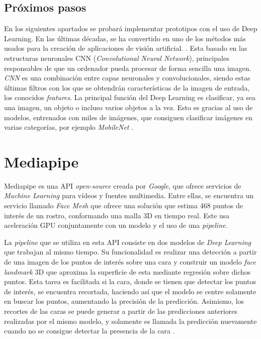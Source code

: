 \vspace{-0.8cm}
\subsection*{Próximos pasos}
\vspace{-0.5cm}
En los siguientes apartados se probará implementar prototipos con el uso de Deep Learning. En las últimas décadas, se ha convertido en uno de los métodos más usados para la creación de aplicaciones de visión artificial. \cite{szeliski_2018}. Esta basado en las estructuras neuronales CNN (\textit{Convolutional Neural Network}), principales responsables de que un ordenador pueda procesar de forma sencilla una imagen. \textit{CNN} es una combinación entre capas neuronales y convolucionales, siendo estas últimas filtros con los que se obtendrán características de la imagen de entrada, los conocidos \textit{features}. La principal función del Deep Learning es clasificar, ya sea una imagen, un objeto o incluso varios objetos a la vez. Esto es gracias al uso de modelos, entrenados con miles de imágenes, que consiguen clasificar imágenes en varias categorías, por ejemplo \textit{MobileNet} \cite{cnn}. 

\newpage
\section{Mediapipe}
\vspace{-0.7cm}

Mediapipe es una API \textit{open-source} creada por \textit{Google}, que ofrece servicios de \textit{Machine Learning} para vídeos y fuentes multimedia. Entre ellas, se encuentra un servicio llamado \textit{Face Mesh} que ofrece una solución que estima 468 puntos de interés de un rostro, conformando una malla 3D en tiempo real. Este usa aceleración GPU conjuntamente con un modelo y el uso de una \textit{pipeline}.

La \textit{pipeline} que se utiliza en esta API consiste en dos modelos de \textit{Deep Learning} que trabajan al mismo tiempo. Su funcionalidad es realizar una detección a partir de una imagen de los puntos de interés sobre una cara y construir un modelo \textit{face landmark} 3D que aproxima la superficie de esta mediante regresión sobre dichos puntos. Esta tarea es facilitada si la cara, donde se tienen que detectar los puntos de interés, se encuentra recortada, haciendo así que el modelo se centre solamente en buscar los puntos, aumentando la precisión de la predicción. Asimismo, los recortes de las caras se puede generar a partir de las predicciones anteriores realizadas por el mismo modelo, y solamente es llamada la predicción nuevamente cuando no se consigue detectar la presencia de la cara \cite{faceMesh}.

